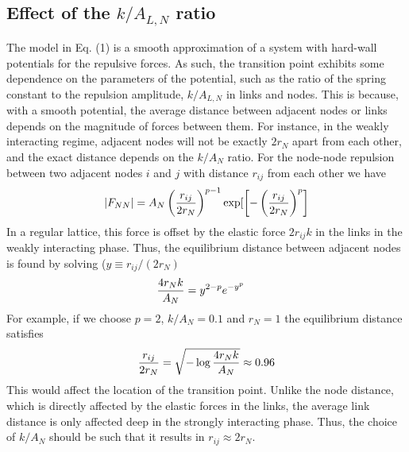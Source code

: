 \documentclass[endfloats,nofootinbib,preprint,floatfix,titlepage,superscriptaddress,linenumbers]{revtex4-1} %
\newcommand{\outNim}[1]{}
\begin{document}
{\subsection{Effect of the $k/A_{L,N}$ ratio \label{ap:par-ka}}
The model in Eq. (1) is a smooth approximation of a system with hard-wall potentials for the repulsive forces. 
As such, the transition point exhibits some dependence on the parameters of the potential, such as the ratio of the spring constant to the repulsion amplitude, $k/A_{L,N}$ in links and nodes. 
This is because, with a smooth potential, the average distance between adjacent nodes or links depends on the magnitude of forces between them. 
For instance, in the weakly interacting regime, adjacent nodes will not be exactly $2r_N$ apart from each other, and the exact distance depends on the $k/A_N$ ratio. 
For the node-node repulsion between two adjacent nodes $i$ and $j$ with distance $r_{ij}$ from each other we have 
\begin{align}
    |F_{NN}| = A_N\left({r_{ij}\over 2r_N}\right)^{p-1} \exp[\left[-\left({r_{ij}\over 2r_N}\right)^{p} \right]
\end{align}
In a regular lattice, this force is offset by the elastic force $2r_{ij} k$ in the links in the weakly interacting phase.
Thus, the equilibrium distance between adjacent nodes is found by solving ($y\equiv r_{ij}/(2r_N)$
\begin{align}
{4r_N k \over A_N} &= y^{2-p} e^{-y^p}    
\end{align}
For example, if we choose $p=2$, $k/A_N = 0.1 $ and $r_N=1$ the equilibrium distance satisfies 
\[{r_{ij}\over 2 r_N} = \sqrt{- \log {4r_N k\over A_N}} \approx 0.96\]
This would affect the location of the transition point.
Unlike the node distance, which is directly affected by the elastic forces in the links, the average link distance is only affected deep in the strongly interacting phase. 
Thus, the choice of $k/A_N$ should be such that it results in $r_{ij} \approx 2r_N$. 

\outNim{
However, we have the same kind of potential for link repulsion and as long as the choice of $k/A_{L,N}$ and $p$ are the same for links and nodes, we expect the ratio of $r_{ij}/(2r_N)$ for adjacent nodes to be similar to $r_{lm}/(2r_L)$ for adjacent links, allowing us to ignore the effect of  
The transition point has some  dependence on the choice of parameters. 
$k/A_L$ ratio, as well as $A_L/A_N$. 
I am still unable to reproduce exactly the transitions I had observed in the 040518 data, which seems to be a copy of the 032818 and 032918 data. 
Now I am able to, but the dependence on $k/A$ is still enigmatic. 
} 

}
\end{document}
